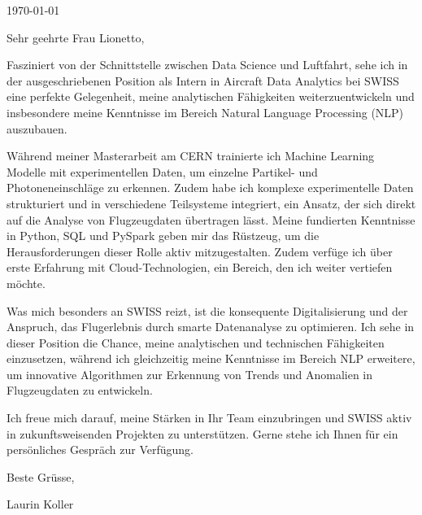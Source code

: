 \documentclass[10pt, a4paper]{article}
\begin{document}
\makeprofile %

\makecontact %

\today %

\makeemployerinfo %

Sehr geehrte Frau Lionetto,

Fasziniert von der Schnittstelle zwischen Data Science und Luftfahrt, sehe ich in der ausgeschriebenen Position als Intern in Aircraft Data Analytics bei SWISS eine perfekte Gelegenheit, meine analytischen Fähigkeiten weiterzuentwickeln und insbesondere meine Kenntnisse im Bereich Natural Language Processing (NLP) auszubauen.

Während meiner Masterarbeit am CERN trainierte ich Machine Learning Modelle mit experimentellen Daten, um einzelne Partikel- und Photoneneinschläge zu erkennen. Zudem habe ich komplexe experimentelle Daten strukturiert und in verschiedene Teilsysteme integriert, ein Ansatz, der sich direkt auf die Analyse von Flugzeugdaten übertragen lässt. Meine fundierten Kenntnisse in Python, SQL und PySpark geben mir das Rüstzeug, um die Herausforderungen dieser Rolle aktiv mitzugestalten. Zudem verfüge ich über erste Erfahrung mit Cloud-Technologien, ein Bereich, den ich weiter vertiefen möchte.

Was mich besonders an SWISS reizt, ist die konsequente Digitalisierung und der Anspruch, das Flugerlebnis durch smarte Datenanalyse zu optimieren. Ich sehe in dieser Position die Chance, meine analytischen und technischen Fähigkeiten einzusetzen, während ich gleichzeitig meine Kenntnisse im Bereich NLP erweitere, um innovative Algorithmen zur Erkennung von Trends und Anomalien in Flugzeugdaten zu entwickeln.

Ich freue mich darauf, meine Stärken in Ihr Team einzubringen und SWISS aktiv in zukunftsweisenden Projekten zu unterstützen. Gerne stehe ich Ihnen für ein persönliches Gespräch zur Verfügung.

Beste Grüsse,

Laurin Koller
\end{document}
